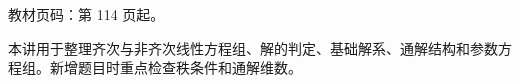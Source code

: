 
\begin{knowledgeBox}
教材页码：第 114 页起。

本讲用于整理齐次与非齐次线性方程组、解的判定、基础解系、通解结构和参数方程组。新增题目时重点检查秩条件和通解维数。
\end{knowledgeBox}
